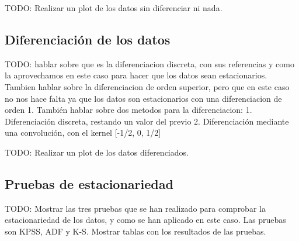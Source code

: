 
TODO: Realizar un plot de los datos sin diferenciar ni nada.

\subsection{Diferenciación de los datos}

TODO: hablar sobre que es la diferenciacion discreta, con sus referencias y como la aprovechamos en este caso para hacer que los datos sean estacionarios.
Tambien hablar sobre la diferenciacion de orden superior, pero que en este caso no nos hace falta ya que los datos son estacionarios con una diferenciacion de orden 1.
También hablar sobre dos metodos para la diferenciacion: 
    1. Diferenciación discreta, restando un valor del previo
    2. Diferenciación mediante una convolución, con el kernel [-1/2, 0, 1/2]

TODO: Realizar un plot de los datos diferenciados.

\subsection{Pruebas de estacionariedad}

TODO: Mostrar las tres pruebas que se han realizado para comprobar la estacionariedad de los datos, y como se han aplicado en este caso.
Las pruebas son KPSS, ADF y K-S.
Mostrar tablas con los resultados de las pruebas.